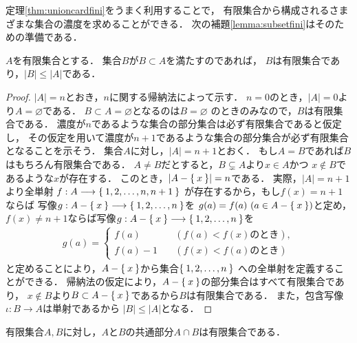    定理\ref{thm:unioncardfini}をうまく利用することで，
   有限集合から構成されるさまざまな集合の濃度を求めることができる．
   次の補題\ref{lemma:subsetfini}はそのための準備である．

   \begin{lemma} \label{lemma:subsetfini}
     $A$を有限集合とする．
     集合$B$が$B \subset A$を満たすのであれば，
     $B$は有限集合であり，$\lvert B \rvert \leq \lvert A \rvert$である．
   \end{lemma}

   \begin{proof}
     $\lvert A \rvert =n$とおき，$n$に関する帰納法によって示す．
     $n=0$のとき，$\lvert A \rvert =0$より$A = \varnothing$である．
     $B \subset A = \varnothing$となるのは$B = \varnothing$
     のときのみなので，$B$は有限集合である．
     濃度が$n$であるような集合の部分集合は必ず有限集合であると仮定し，
     その仮定を用いて濃度が$n+1$であるような集合の部分集合が必ず有限集合となることを示そう．
     集合$A$に対し，$\lvert A \rvert = n+1$とおく．
     もし$A=B$であれば$B$はもちろん有限集合である．
     $A \neq B$だとすると，$B \subsetneq A$より$x \in A $かつ
     $x \notin B$であるような$x$が存在する．
     このとき，$\lvert A - \Set{x} \rvert = n$である．
     実際，$\lvert A \rvert = n+1$より全単射
     $f: A \longrightarrow \Set{ 1,2, \ldots , n, n+1}$
     が存在するから，もし$f(x) = n+1$ならば
     写像$g:A - \Set{x} \longrightarrow \Set{ 1,2, \ldots , n}$を
     $g(a) = f(a) \ (a \in A- \Set{x})$と定め，
     $f(x) \neq n+1$ならば写像$g: A- \Set{x} \longrightarrow \Set{ 1,2, \ldots , n}$を
     \begin{align*}
       g(a) = \left \{ 
         \begin{aligned}
           f(a) \qquad & ( f(a) < f(x) \text{のとき} ) , \\
           f(a) -1 \quad & ( f(x) < f(a) \text{のとき} )
         \end{aligned}
         \right.
     \end{align*}
     と定めることにより，$A- \Set{x}$から集合$\Set{1,2, \ldots ,n}$
     への全単射を定義することができる．
     帰納法の仮定により，$A- \Set{x}$の部分集合はすべて有限集合であり，
     $x \notin B$より$B \subset A - \Set{x}$であるから$B$は有限集合である．
     また，包含写像$\iota : B \longrightarrow A$は単射であるから
     $\lvert B \rvert \leq \lvert A \rvert$となる．
   \end{proof}

   \begin{coro}
     有限集合$A,  B$に対し，$A$と$B$の共通部分$A \cap B$は有限集合である．
   \end{coro}

